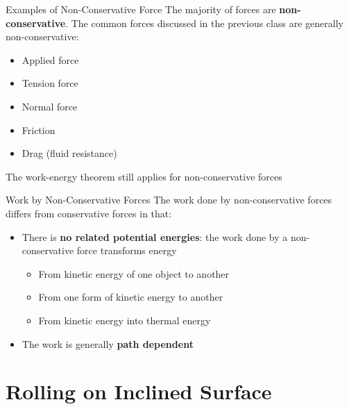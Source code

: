 \documentclass[12pt,compress,aspectratio=169]{beamer}
\begin{document}
\begin{frame}{Examples of Non-Conservative Force}
  The majority of forces are \textbf{non-conservative}. The common forces
  discussed in the previous class are generally non-conservative:
  \begin{itemize}
  \item Applied force
  \item Tension force
  \item Normal force
  \item Friction
  \item Drag (fluid resistance)
  \end{itemize}
  The work-energy theorem still applies for non-conservative forces
\end{frame}



\begin{frame}{Work by Non-Conservative Forces}
  The work done by non-conservative forces differs from conservative forces in
  that:
  \begin{itemize}
  \item There is \textbf{no related potential energies}: the work done by a
    non-conservative force transforms energy
    \begin{itemize}
    \item From kinetic energy of one object to another
    \item From one form of kinetic energy to another
    \item From kinetic energy into thermal energy
    \end{itemize}
  \item The work is generally \textbf{path dependent}
  \end{itemize}
\end{frame}




\section{Rolling on Inclined Surface}
\end{document}
